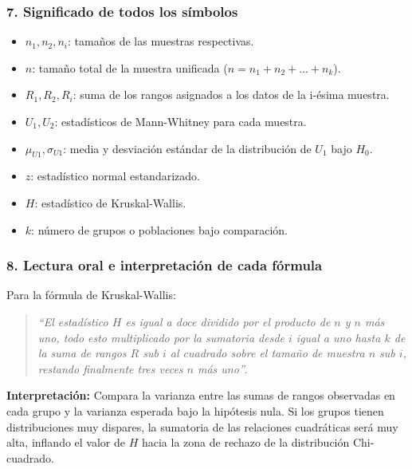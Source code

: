 \documentclass[11pt,a4paper]{article}
\begin{document}
\subsubsection{7. Significado de todos los símbolos}
\begin{itemize}
    \item $n_1, n_2, n_i$: tamaños de las muestras respectivas.
    \item $n$: tamaño total de la muestra unificada ($n = n_1 + n_2 + \dots + n_k$).
    \item $R_1, R_2, R_i$: suma de los rangos asignados a los datos de la i-ésima muestra.
    \item $U_1, U_2$: estadísticos de Mann-Whitney para cada muestra.
    \item $\mu_{U1}, \sigma_{U1}$: media y desviación estándar de la distribución de $U_1$ bajo $H_0$.
    \item $z$: estadístico normal estandarizado.
    \item $H$: estadístico de Kruskal-Wallis.
    \item $k$: número de grupos o poblaciones bajo comparación.
\end{itemize}

\subsubsection{8. Lectura oral e interpretación de cada fórmula}
Para la fórmula de Kruskal-Wallis:
\begin{quote}
    \textit{``El estadístico $H$ es igual a doce dividido por el producto de $n$ y $n$ más uno, todo esto multiplicado por la sumatoria desde $i$ igual a uno hasta $k$ de la suma de rangos $R$ sub $i$ al cuadrado sobre el tamaño de muestra $n$ sub $i$, restando finalmente tres veces $n$ más uno''}.
\end{quote}
\textbf{Interpretación:} Compara la varianza entre las sumas de rangos observadas en cada grupo y la varianza esperada bajo la hipótesis nula. Si los grupos tienen distribuciones muy dispares, la sumatoria de las relaciones cuadráticas será muy alta, inflando el valor de $H$ hacia la zona de rechazo de la distribución Chi-cuadrado.
\end{document}
